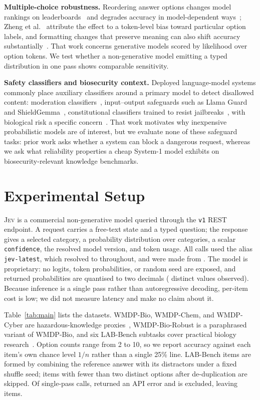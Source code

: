\documentclass[conference,compsoc]{IEEEtran}
\newcommand{\jev}{\textsc{Jev}}
\begin{document}
\textbf{Multiple-choice robustness.} Reordering answer options changes model rankings on leaderboards~\cite{alzahrani} and
degrades accuracy in model-dependent ways~\cite{gupta}; Zheng et al.~\cite{zheng}
attribute the effect to a token-level bias toward particular option labels, and
formatting changes that preserve meaning can also shift accuracy
substantially~\cite{formatspread}. That work concerns generative models scored by likelihood
over option tokens. We test whether a non-generative model emitting a typed distribution in
one pass shows comparable sensitivity.

\textbf{Safety classifiers and biosecurity context.} Deployed language-model systems commonly place auxiliary classifiers around a primary
model to detect disallowed content: moderation classifiers~\cite{openaimod}, input--output safeguards such as Llama Guard~\cite{llamaguard} and
ShieldGemma~\cite{shieldgemma}, constitutional classifiers trained to resist
jailbreaks~\cite{constclass}, with biological risk a specific concern~\cite{biorisk}.
That work motivates why inexpensive probabilistic models are of interest, but we
evaluate none of these safeguard tasks: prior work asks whether a system can block a
dangerous request, whereas we ask what reliability properties a cheap System-1 model
exhibits on biosecurity-relevant knowledge benchmarks.

\section{Experimental Setup}
\label{sec:setup}

\jev{} is a commercial non-generative model queried through the
\texttt{v1} REST endpoint. A request carries a free-text state and a typed question; the
response gives a selected category, a probability distribution over categories, a scalar
\texttt{confidence}, the resolved model version, and token usage. All calls used the
alias \texttt{jev-latest}, which resolved to \texttt{\statModelVersion{}} throughout,
and were made from \statCollectionDates{}. The model is proprietary: no logits, token
probabilities, or random seed are exposed, and returned probabilities are quantised to
two decimals (\statDistinctProbs{} distinct values observed). Because inference is a
single pass rather than autoregressive decoding, per-item cost is low; we did not
measure latency and make no claim about it.

Table~\ref{tab:main} lists the \statNDatasets{} datasets. WMDP-Bio,
WMDP-Chem, and WMDP-Cyber are hazardous-knowledge proxies~\cite{wmdp}, WMDP-Bio-Robust is a
paraphrased variant of WMDP-Bio, and six LAB-Bench subtasks cover practical biology
research~\cite{labbench}. Option counts range from 2 to 10, so we report accuracy against
each item's own chance level $1/n$ rather than a single 25\% line. LAB-Bench items are
formed by combining the reference answer with its distractors under a fixed shuffle seed;
items with fewer than two distinct options after de-duplication are skipped. Of \statNItemsRaw{} single-pass calls, \statNErrors{} returned an API error and is
excluded, leaving \statNItems{} items.
\end{document}
